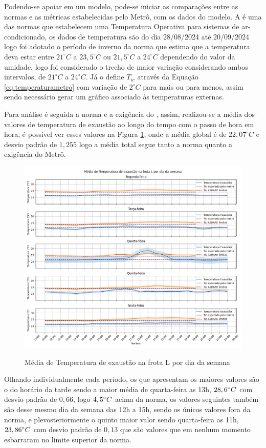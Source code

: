 \documentclass[acronym,symbols,table]{fei}
\begin{document}
Podendo-se apoiar em um modelo, pode-se iniciar as comparações entre as normas e as métricas estabelecidas pelo Metrô, com os dados do modelo. A \textcite{abnt216401} é uma das normas que estabelecem uma Temperatura Operativa para sistemas de ar-condicionado, os dados de temperatura são do dia 28/08/2024 até 20/09/2024 logo foi adotado o período de inverno da norma que estima que a temperatura deva estar entre $21 ^\circ C$ a $23,5 ^\circ C$ ou $21,5 ^\circ C$ a $24 ^\circ C$ dependendo do valor da umidade, logo foi considerado o trecho de maior variação considerando ambos intervalos, de $21 ^\circ C$ a $24 ^\circ C$. Já o \textcite{metrosp2024} define $T_{ic}$ através da Equação \ref{eq:temperaturametro} com variação de $2 ^\circ C$ para mais ou para menos, assim sendo necessário gerar um gráfico associado às temperaturas externas.


Para análise é seguida a norma e a exigência do \textcite{metrosp2024}, assim, realizou-se a média dos valores de temperatura de exaustão ao longo do tempo com o passo de hora em hora, é possível ver esses valores na Figura \ref{fig:mediatemp}, onde a média global é de $22,07 ^\circ C$ e desvio padrão de $1,255$ logo a média total segue tanto a norma quanto a exigência do Metrô. 

\begin{figure}[!htb]
	\centering
	\caption{Média de Temperatura de exaustão na frota L por dia da semana}
    \includegraphics[width=0.7\linewidth]{Imagens/Media_de_Temperatura_de_exaustao_na_frota_L_por_dia_da_semana.png}
    \label{fig:mediatemp}
\end{figure}
\newpage
Olhando individualmente cada período, os que apresentam os maiores valores são o do horário da tarde sendo a maior média de quarta-feira as 13h, $28,6\space ^\circ C$ com desvio padrão de $0,66$, logo $4,5 \space^\circ C$ acima da norma, os valores seguintes também são desse mesmo dia da semana das 12h a 15h, sendo os únicos valores fora da norma, e plevosteriormente o quinto maior valor sendo quarta-feira as 11h, $23,86\space^\circ C$ com desvio padrão de $0,13$ que são valores que em nenhum momento esbarraram no limite superior da norma. 
\end{document}
